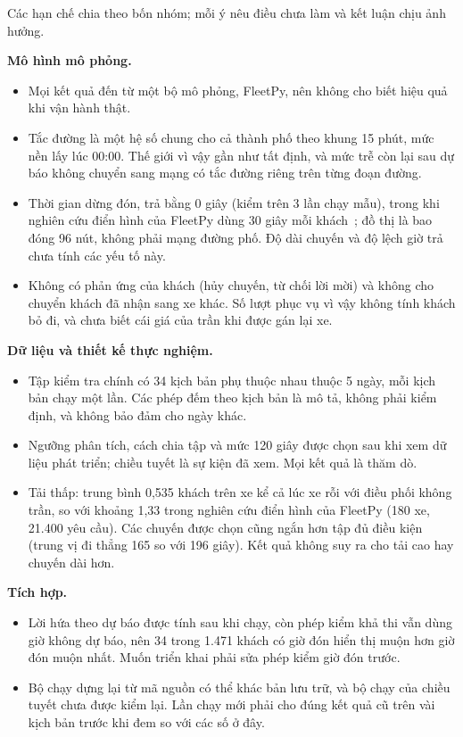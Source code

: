 Các hạn chế chia theo bốn nhóm; mỗi ý nêu điều chưa làm và kết luận chịu ảnh hưởng.

\textbf{Mô hình mô phỏng.}
\begin{itemize}[leftmargin=1.2cm,itemsep=2pt,topsep=3pt]
\item Mọi kết quả đến từ một bộ mô phỏng, FleetPy, nên không cho biết hiệu quả khi vận hành thật.
\item Tắc đường là một hệ số chung cho cả thành phố theo khung 15 phút, mức nền lấy lúc 00:00. Thế giới vì vậy gần
như tất định, và mức trễ còn lại sau dự báo không chuyển sang mạng có tắc đường riêng trên từng đoạn đường.
\item Thời gian dừng đón, trả bằng 0 giây (kiểm trên 3 lần chạy mẫu), trong khi nghiên cứu điển hình của FleetPy dùng
30 giây mỗi khách~\cite{engelhardt2026}; đồ thị là bao đóng 96 nút, không phải mạng đường phố. Độ dài chuyến và độ
lệch giờ trả chưa tính các yếu tố này.
\item Không có phản ứng của khách (hủy chuyến, từ chối lời mời) và không cho chuyển khách đã nhận sang xe khác. Số
lượt phục vụ vì vậy không tính khách bỏ đi, và chưa biết cái giá của trần khi được gán lại xe.
\end{itemize}

\textbf{Dữ liệu và thiết kế thực nghiệm.}
\begin{itemize}[leftmargin=1.2cm,itemsep=2pt,topsep=3pt]
\item Tập kiểm tra chính có 34 kịch bản phụ thuộc nhau thuộc 5 ngày, mỗi kịch bản chạy một lần. Các phép đếm theo
kịch bản là mô tả, không phải kiểm định, và không bảo đảm cho ngày khác.
\item Ngưỡng phân tích, cách chia tập và mức 120 giây được chọn sau khi xem dữ liệu phát triển; chiều tuyết là sự
kiện đã xem. Mọi kết quả là thăm dò.
\item Tải thấp: trung bình 0,535 khách trên xe kể cả lúc xe rỗi với điều phối không trần, so với khoảng 1,33 trong
nghiên cứu điển hình của FleetPy (180 xe, 21.400 yêu cầu). Các chuyến được chọn cũng ngắn hơn tập đủ điều kiện (trung
vị đi thẳng 165 so với 196 giây). Kết quả không suy ra cho tải cao hay chuyến dài hơn.
\end{itemize}

\textbf{Tích hợp.}
\begin{itemize}[leftmargin=1.2cm,itemsep=2pt,topsep=3pt]
\item Lời hứa theo dự báo được tính sau khi chạy, còn phép kiểm khả thi vẫn dùng giờ không dự báo, nên 34 trong 1.471
khách có giờ đón hiển thị muộn hơn giờ đón muộn nhất. Muốn triển khai phải sửa phép kiểm giờ đón trước.
\item Bộ chạy dựng lại từ mã nguồn có thể khác bản lưu trữ, và bộ chạy của chiều tuyết chưa được kiểm lại. Lần chạy
mới phải cho đúng kết quả cũ trên vài kịch bản trước khi đem so với các số ở đây.
\end{itemize}

